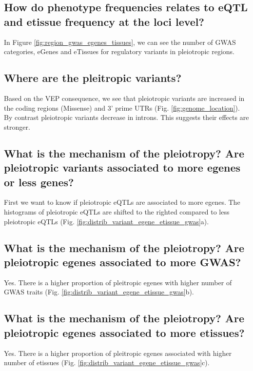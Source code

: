 \subsection*{How do phenotype frequencies relates to eQTL and etissue frequency at the loci level?}

In Figure \ref{fig:region_gwas_egenes_tissues}, we can see the number of GWAS categories, eGenes and eTissues for regulatory variants in pleiotropic regions.

\subsection*{Where are the pleitropic variants?}

Based on the VEP consequence, we see that pleiotropic variants are increased in the coding regions (Missense) and 3' prime UTRs (Fig. \ref{fig:genome_location}).
By contrast pleiotropic variants decrease in introns.
This suggests their effects are stronger.

\subsection*{What is the mechanism of the pleiotropy? Are pleiotropic variants associated to more egenes or less genes?}

First we want to know if pleiotropic eQTLs are associated to more egenes.
The histograms of pleiotropic eQTLs are shifted to the righted compared to less pleiotropic eQTLs (Fig. \ref{fig:distrib_variant_egene_etissue_gwas}a).

\subsection*{What is the mechanism of the pleiotropy? Are pleiotropic egenes associated to more GWAS?}

Yes. There is a higher proportion of pleitropic egenes with higher number of GWAS traits (Fig. \ref{fig:distrib_variant_egene_etissue_gwas}b).

\subsection*{What is the mechanism of the pleiotropy? Are pleiotropic egenes associated to more etissues?}

Yes. There is a higher proportion of pleitropic egenes associated with higher number of etissues (Fig. \ref{fig:distrib_variant_egene_etissue_gwas}c).

